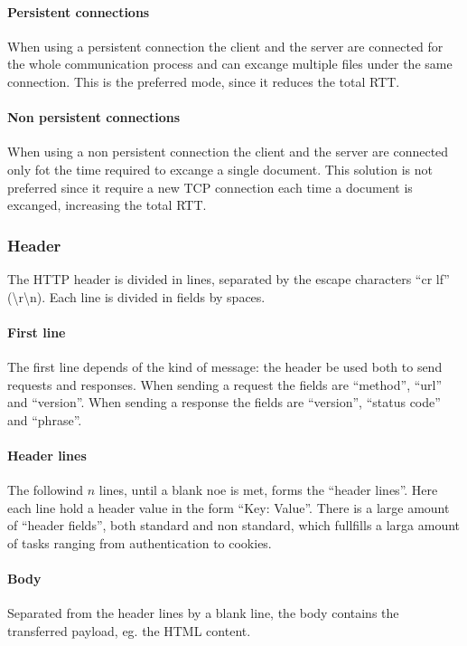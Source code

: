\documentclass{article}
\begin{document}
\paragraph{Persistent connections}
When using a persistent connection the client and the server are connected for the whole communication process and can excange multiple files under the same connection. This is the preferred mode, since it reduces the total RTT.

\paragraph{Non persistent connections}
When using a non persistent connection the client and the server are connected only fot the time required to excange a single document. This solution is not preferred since it require a new TCP connection each time a document is excanged, increasing the total RTT.

\subsubsection{Header}

The HTTP header is divided in lines, separated by the escape characters ``cr lf'' (\textbackslash r\textbackslash n).
Each line is divided in fields by spaces.

\paragraph{First line}
The first line depends of the kind of message: the header be used both to send requests and responses. When sending a request the fields are ``method'', ``url'' and ``version''. When sending a response the fields are ``version'', ``status code'' and ``phrase''.

\paragraph{Header lines}
The followind $n$ lines, until a blank noe is met, forms the ``header lines''. Here each line hold a header value in the form ``Key: Value''. There is a large amount of ``header fields'', both standard and non standard, which fullfills a larga amount of tasks ranging from authentication to cookies.

\paragraph{Body}
Separated from the header lines by a blank line, the body contains the transferred payload, eg. the HTML content.
\end{document}
